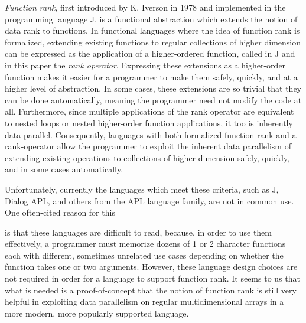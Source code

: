 \textit{Function rank}, first introduced by K. Iverson in 1978\cite{opandfunc} and implemented in the programming language J, is a functional abstraction which extends the notion of data rank to functions.
In functional languages where the idea of function rank is formalized, extending existing functions to regular collections of higher dimension can be expressed as the application of a higher-ordered function, 
called in J and in this paper the \textit{rank operator}.%
Expressing these extensions as a higher-order function makes it easier for a programmer to make them safely, quickly, and at a higher level of abstraction.
In some cases, these extensions are so trivial that they can be done automatically, meaning the programmer need not modify the code at all.%
Furthermore, since multiple applications of the rank operator are equivalent to nested loops or nested higher-order function applications, it too is inherently data-parallel.
Consequently, languages with both formalized function rank and a rank-operator allow the programmer to 
exploit the inherent data parallelism of extending existing operations to collections of higher dimension safely, quickly, and in some cases automatically.

Unfortunately, currently the languages which meet these criteria, such as J, Dialog APL, and others from the APL language family, are not in common use.
One often-cited reason for this \begin{comment}TODO cite\end{comment} is that these languages are difficult to read, 
because, in order to use them effectively, a programmer must memorize dozens of 1 or 2 character functions each with different, sometimes unrelated use cases depending on whether the function takes one or two arguments.%
However, these language design choices are not required in order for a language to support function rank.
It seems to us that what is needed is a proof-of-concept that the notion of function rank is still very helpful in exploiting data parallelism on regular multidimensional arrays in a more modern, more popularly supported language.

